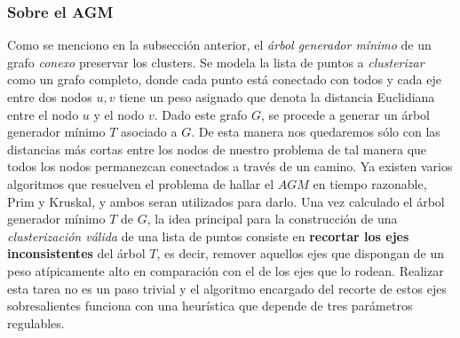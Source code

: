 \subsubsection{Sobre el AGM}
Como se menciono en la subsección anterior, el \textit{árbol generador mínimo} de un grafo \textit{conexo} preservar los clusters. Se modela la lista de puntos a \textit{clusterizar} como un grafo completo, donde cada punto está conectado con todos y cada eje entre dos nodos $u, v$ tiene un peso asignado que denota la distancia Euclidiana entre el nodo $u$ y el nodo $v$. Dado este grafo $G$, se procede a generar un árbol generador mínimo $T$ asociado a $G$. De esta manera nos quedaremos sólo con las distancias más cortas entre los nodos de nuestro problema de tal manera que todos los nodos permanezcan conectados a través de un camino. Ya existen varios algoritmos que resuelven el problema de hallar el $AGM$ en tiempo razonable, Prim y Kruskal, y ambos seran utilizados para darlo. 
Una vez calculado el árbol generador mínimo $T$ de $G$, la idea principal para la construcción de una \textit{clusterización válida} de una lista de puntos consiste en \textbf{recortar los ejes inconsistentes} del árbol $T$, es decir, remover aquellos ejes que dispongan de un peso atípicamente alto en comparación con el de los ejes que lo rodean. Realizar esta tarea no es un paso trivial y el algoritmo encargado del recorte de estos ejes sobresalientes funciona con una heurística que depende de tres parámetros regulables.
